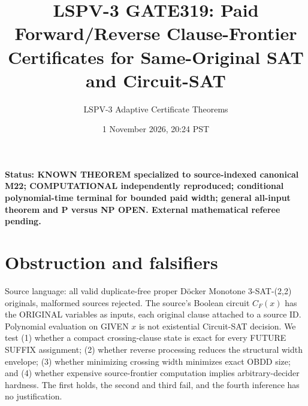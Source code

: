 \documentclass[11pt]{article}
\title{LSPV-3 GATE319: Paid Forward/Reverse Clause-Frontier Certificates for Same-Original SAT and Circuit-SAT}
\author{LSPV-3 Adaptive Certificate Theorems}
\date{1 November 2026, 20:24 PST}
\begin{document}
\maketitle
\noindent\textbf{Status: KNOWN THEOREM specialized to source-indexed canonical M22; COMPUTATIONAL independently reproduced; conditional polynomial-time terminal for bounded paid width; general all-input theorem and P versus NP OPEN. External mathematical referee pending.}

\section{Obstruction and falsifiers}
\noindent Source language: all valid duplicate-free proper D\"ocker Monotone 3-SAT-(2,2) originals, malformed sources rejected. The source's Boolean circuit $C_F(x)$ has the ORIGINAL variables as inputs, each original clause attached to a source ID. Polynomial evaluation on GIVEN $x$ is not existential Circuit-SAT decision. We test (1) whether a compact crossing-clause state is exact for every FUTURE SUFFIX assignment; (2) whether reverse processing reduces the structural width envelope; (3) whether minimizing crossing width minimizes exact OBDD size; and (4) whether expensive source-frontier computation implies arbitrary-decider hardness. The first holds, the second and third fail, and the fourth inference has no justification.
\end{document}

